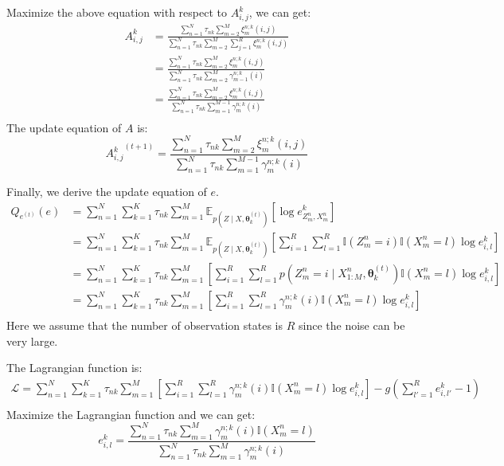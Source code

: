 \documentclass[12pt]{article}
\newenvironment{problem}[2][Problem]{\begin{trivlist}
\item[\hskip \labelsep {\bfseries #1}\hskip \labelsep {\bfseries #2.}]}{\end{trivlist}}
\begin{document}
\begin{problem}{2.7.21}
Maximize the above equation with respect to $A^k_{i,j}$, we can get:
\begin{align*}
    A^k_{i,j}&= \frac{\sum_{n=1}^{N} \tau_{nk} \sum_{m=2}^{M} \xi_{m}^{n;k}(i,j)}
                     {\sum_{n=1}^{N} \tau_{nk} \sum_{m=2}^{M} \sum_{j=1}^{R} \xi_{m}^{n;k}(i,j)} \\
             &= \frac{\sum_{n=1}^{N} \tau_{nk} \sum_{m=2}^{M} \xi_{m}^{n;k}(i,j)}
                     {\sum_{n=1}^{N} \tau_{nk} \sum_{m=2}^{M} \gamma_{m-1}^{n;k}(i)} \\
             &= \frac{\sum_{n=1}^{N} \tau_{nk} \sum_{m=2}^{M} \xi_{m}^{n;k}(i,j)}
                     {\sum_{n=1}^{N} \tau_{nk} \sum_{m=1}^{M-1} \gamma_{m}^{n;k}(i)} \\
\end{align*}
The update equation of $A$ is:
\begin{equation}
    {A^k_{i,j}}^{(t+1)} = 
        \frac{\sum_{n=1}^{N} \tau_{nk} \sum_{m=2}^{M} \xi_{m}^{n;k}(i,j)}
             {\sum_{n=1}^{N} \tau_{nk} \sum_{m=1}^{M-1} \gamma_{m}^{n;k}(i)}
\end{equation}

Finally, we derive the update equation of $e$.
\begin{align*}
    Q_{e^{(t)}}(e) &= \sum_{n=1}^{N} \sum_{k=1}^{K} \tau_{nk} \sum_{m=1}^{M} 
        \mathbb{E}_{p(Z\mid X, \bm{\theta}^{(t)}_k)}[\log e^k_{Z^n_{m},X^n_m}] \\
    &= \sum_{n=1}^{N} \sum_{k=1}^{K} \tau_{nk} \sum_{m=1}^{M} 
        \mathbb{E}_{p(Z\mid X, \bm{\theta}^{(t)}_k)}
            [\sum_{i=1}^{R}\sum_{l=1}^{R}
            \mathbb{I}(Z^n_{m} = i)\mathbb{I}(X^n_{m} = l)\log e^k_{i,l}] \\
    &= \sum_{n=1}^{N} \sum_{k=1}^{K} \tau_{nk} \sum_{m=1}^{M} 
        [\sum_{i=1}^{R}\sum_{l=1}^{R} p(Z^n_{m} = i\mid X^{n}_{1:M}, \bm{\theta}^{(t)}_k)
        \mathbb{I}(X^n_{m} = l)\log e^k_{i,l}] \\
    &= \sum_{n=1}^{N} \sum_{k=1}^{K} \tau_{nk} \sum_{m=1}^{M} 
        [\sum_{i=1}^{R}\sum_{l=1}^{R} \gamma_{m}^{n;k}(i)
        \mathbb{I}(X^n_{m} = l)\log e^k_{i,l}] \\
\end{align*}
Here we assume that the number of observation states is $R$ since the noise can
be very large.

The Lagrangian function is:
\begin{align*}
    \mathcal{L} = 
        \sum_{n=1}^{N} \sum_{k=1}^{K} \tau_{nk} \sum_{m=1}^{M} 
            [\sum_{i=1}^{R}\sum_{l=1}^{R} \gamma_{m}^{n;k}(i)
            \mathbb{I}(X^n_{m} = l)\log e^k_{i,l}] 
        - g(\sum_{l'=1}^{R}e^k_{i,l'} - 1)\\
\end{align*}
Maximize the Lagrangian function and we can get:
\begin{equation}
    e^k_{i,l} = 
    \frac{\sum_{n=1}^{N}\tau_{nk} \sum_{m=1}^{M} \gamma_{m}^{n;k}(i)\mathbb{I}(X^n_{m} = l)}
        {\sum_{n=1}^{N}\tau_{nk} \sum_{m=1}^{M} \gamma_{m}^{n;k}(i)}
\end{equation}


\end{problem}
\end{document}
